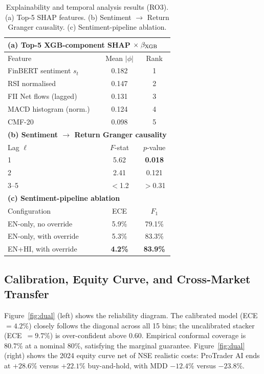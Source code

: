 \documentclass[12pt,a4paper]{article}
\begin{document}
\begin{table}[h]
\centering
\caption{Explainability and temporal analysis results (RO3).
(a) Top-5 SHAP features. (b) Sentiment $\to$ Return Granger causality.
(c) Sentiment-pipeline ablation.}
\label{tab:xai}
\footnotesize
\begin{tabular}{lcc}
\toprule
\multicolumn{3}{l}{\textbf{(a) Top-5 XGB-component SHAP $\times\;\beta_{\rm XGB}$}} \\
\midrule
Feature & Mean $|\phi|$ & Rank \\
\midrule
FinBERT sentiment $s_t$ & 0.182 & 1 \\
RSI normalised          & 0.147 & 2 \\
FII Net flows (lagged)  & 0.131 & 3 \\
MACD histogram (norm.)  & 0.124 & 4 \\
CMF-20                  & 0.098 & 5 \\
\midrule
\multicolumn{3}{l}{\textbf{(b) Sentiment $\to$ Return Granger causality}} \\
\midrule
Lag $\ell$ & $F$-stat & $p$-value \\
\midrule
1 & 5.62 & \textbf{0.018} \\
2 & 2.41 & 0.121 \\
3--5 & $<$1.2 & $>$0.31 \\
\midrule
\multicolumn{3}{l}{\textbf{(c) Sentiment-pipeline ablation}} \\
\midrule
Configuration & ECE & $F_1$ \\
\midrule
EN-only, no override   & 5.9\% & 79.1\% \\
EN-only, with override & 5.3\% & 83.3\% \\
EN+HI, with override   & \textbf{4.2\%} & \textbf{83.9\%} \\
\bottomrule
\end{tabular}
\end{table}

\subsection{Calibration, Equity Curve, and Cross-Market Transfer}

Figure~\ref{fig:dual} (left) shows the reliability diagram. The calibrated
model (ECE~$=4.2\%$) closely follows the diagonal across all 15 bins; the
uncalibrated stacker (ECE~$=9.7\%$) is over-confident above 0.60.
Empirical conformal coverage is 80.7\% at a nominal 80\%, satisfying the
marginal guarantee. Figure~\ref{fig:dual} (right) shows the 2024 equity
curve net of NSE realistic costs: ProTrader AI ends at $+28.6\%$ versus
$+22.1\%$ buy-and-hold, with MDD $-12.4\%$ versus $-23.8\%$.
\end{document}
